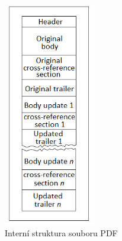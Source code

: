 \begin{figure}[h!]
\centering
\includegraphics[width=4cm]{img/pdf_internal_structure}
\caption{Interní struktura souboru PDF}
\label{fig:pdf_internal_structure}
\end{figure}

